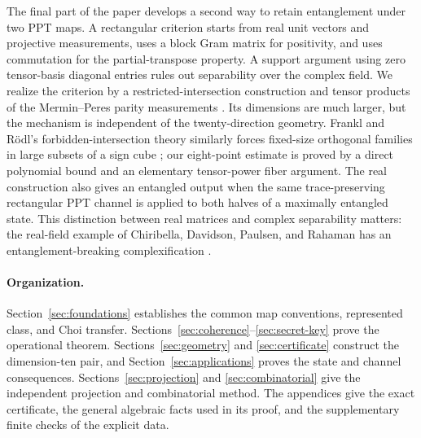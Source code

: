 The final part of the paper develops a second way to retain entanglement
under two PPT maps.  A rectangular criterion starts from real unit vectors
and projective measurements, uses a block Gram matrix for positivity, and
uses commutation for the partial-transpose property.  A support argument
using zero tensor-basis diagonal entries rules out separability over the
complex field.  We realize
the criterion by a restricted-intersection construction
\cite{FW1981,ABS1991} and tensor products of the Mermin--Peres parity
measurements \cite{Mermin1990,Peres1990,Peres1991}.  Its dimensions are much
larger, but the mechanism is independent of the twenty-direction geometry.
Frankl and Rödl's forbidden-intersection theory similarly forces fixed-size
orthogonal families in large subsets of a sign cube
\cite[Theorem 1.11]{FR1987}; our eight-point estimate is proved by a direct
polynomial bound and an elementary tensor-power fiber argument.
The real construction also gives an entangled output when the same
trace-preserving rectangular PPT channel is applied to both halves of a
maximally entangled state.  This distinction between real matrices and complex
separability matters: the real-field example of Chiribella, Davidson,
Paulsen, and Rahaman has an entanglement-breaking complexification
\cite[Example 9.6]{CDPR2023}.

\paragraph{Organization.}
Section~\ref{sec:foundations} establishes the common map conventions,
represented class, and Choi transfer.  Sections~\ref{sec:coherence}--\ref{sec:secret-key}
prove the operational theorem.  Sections~\ref{sec:geometry} and
\ref{sec:certificate} construct the dimension-ten pair, and
Section~\ref{sec:applications} proves the state and channel consequences.
Sections~\ref{sec:projection} and \ref{sec:combinatorial} give the independent
projection and combinatorial method.  The appendices give the exact certificate, the general algebraic facts
used in its proof, and the supplementary finite checks of the explicit data.
